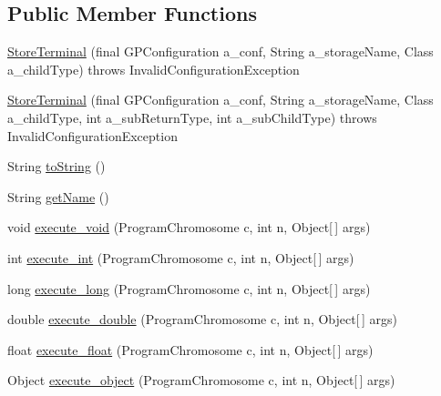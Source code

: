 \subsection*{Public Member Functions}
\begin{DoxyCompactItemize}
\item 
\hyperlink{classorg_1_1jgap_1_1gp_1_1function_1_1_store_terminal_a97e0cb66ef943ee3775ab41d1608271a}{Store\-Terminal} (final G\-P\-Configuration a\-\_\-conf, String a\-\_\-storage\-Name, Class a\-\_\-child\-Type)  throws Invalid\-Configuration\-Exception 
\item 
\hyperlink{classorg_1_1jgap_1_1gp_1_1function_1_1_store_terminal_a679930ad0fd6298af33dd3534f4f0675}{Store\-Terminal} (final G\-P\-Configuration a\-\_\-conf, String a\-\_\-storage\-Name, Class a\-\_\-child\-Type, int a\-\_\-sub\-Return\-Type, int a\-\_\-sub\-Child\-Type)  throws Invalid\-Configuration\-Exception 
\item 
String \hyperlink{classorg_1_1jgap_1_1gp_1_1function_1_1_store_terminal_a85345ef1c807daf08e04735eb90ae92c}{to\-String} ()
\item 
String \hyperlink{classorg_1_1jgap_1_1gp_1_1function_1_1_store_terminal_a45ce72ba1477e55ad1ef50f84330749c}{get\-Name} ()
\item 
void \hyperlink{classorg_1_1jgap_1_1gp_1_1function_1_1_store_terminal_a27c8297d0ccc8a4da974888b0b56cff8}{execute\-\_\-void} (Program\-Chromosome c, int n, Object\mbox{[}$\,$\mbox{]} args)
\item 
int \hyperlink{classorg_1_1jgap_1_1gp_1_1function_1_1_store_terminal_a3d119c6e57ea53799ad24e70f864bacc}{execute\-\_\-int} (Program\-Chromosome c, int n, Object\mbox{[}$\,$\mbox{]} args)
\item 
long \hyperlink{classorg_1_1jgap_1_1gp_1_1function_1_1_store_terminal_a6a78614dddd83720fa7a572ddd375751}{execute\-\_\-long} (Program\-Chromosome c, int n, Object\mbox{[}$\,$\mbox{]} args)
\item 
double \hyperlink{classorg_1_1jgap_1_1gp_1_1function_1_1_store_terminal_a87ade29ffe8b9380931a7010286c4cf4}{execute\-\_\-double} (Program\-Chromosome c, int n, Object\mbox{[}$\,$\mbox{]} args)
\item 
float \hyperlink{classorg_1_1jgap_1_1gp_1_1function_1_1_store_terminal_aaf81bf6d0291df75e35890c73dae4659}{execute\-\_\-float} (Program\-Chromosome c, int n, Object\mbox{[}$\,$\mbox{]} args)
\item 
Object \hyperlink{classorg_1_1jgap_1_1gp_1_1function_1_1_store_terminal_a7ca2947a9f889fcbc48027a4565d8391}{execute\-\_\-object} (Program\-Chromosome c, int n, Object\mbox{[}$\,$\mbox{]} args)

\end{DoxyCompactItemize}
